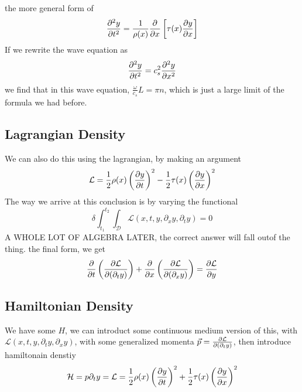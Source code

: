 \documentclass{article} \usepackage{amsmath} \usepackage{amssymb} \usepackage{amsthm} \usepackage[margin=0.2in]{geometry} \usepackage{hyperref} \usepackage{physics} \usepackage{tikz} \usepackage{mathtools} \mathtoolsset{showonlyrefs} \theoremstyle{definition} \newtheorem{theorem}{Theorem}[section] \newtheorem{corollary}{Corollary}[theorem] \newtheorem{lemma}[theorem]{Lemma} \newtheorem{definition}{Definition}[section] \author{Connor Duncan} \date{\today}
\begin{document}
the more general form of \begin{equation} \pdv[2]{y}{t}=\frac{1}{\rho(x)}\pdv[]{x}\left[\tau(x)\pdv{y}{x}\right] \end{equation} If we rewrite the wave equation as \begin{equation} \pdv[2]{y}{t}=c_s^2\pdv[2]{y}{x} \end{equation} we find that in this wave equation, $\frac{\omega}{c_s}L=\pi n$, which is just a large limit of the formula we had before. \subsection{Lagrangian Density} We can also do this using the lagrangian, by making an argument \begin{equation} \mathcal L=\frac{1}{2}\rho(x)\left(\pdv{y}{t}\right)^2-\frac{1}{2}\tau(x)\left(\pdv{y}{x}\right)^2 \end{equation} The way we arrive at this conclusion is by varying the functional \begin{equation} \delta\int_{t_1}^{t_2}\int_\mathcal{D}\mathcal L(x,t,y,\partial_xy,\partial_ty)=0 \end{equation} A WHOLE LOT OF ALGEBRA LATER, the correct answer will fall outof the thing. the final form, we get \begin{equation} \pdv{t}\left(\pdv{\mathcal L}{(\partial_t y)}\right)+\pdv{x}\left(\pdv{\mathcal L}{(\partial_xy)}\right)=\pdv{\mathcal L}{y} \end{equation} \subsection{Hamiltonian Density} We have some $H$, we can introduct some continuous medium version of this, with $\mathcal L(x,t,y,\partial_ty,\partial_xy)$, with some generalized momenta $\vec{p}=\pdv{\mathcal L}{(\partial_ty)}$, then introduce hamiltonain denstiy \begin{equation} \mathcal H=p\partial_ty=\mathcal L=\frac{1}{2}\rho(x)\left(\pdv{y}{t}\right)^2+\frac{1}{2}\tau(x)\left(\pdv{y}{x}\right)^2 \end{equation}
\end{document}
